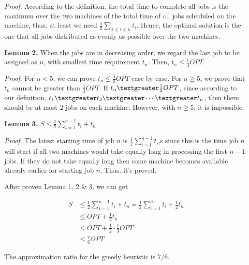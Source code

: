 \textit{Proof.} According to the definition, the total time to complete all jobs is the maximum over the two machines of the total time of all jobs scheduled on the machine, thus, at least we need $ \frac{1}{2} \sum_{1 \le i \le n} t_i$. Hence, the optimal solution is the one that all jobs distributed as evenly as possible over the two machines.

\textbf{Lemma 2.} When the jobs are in decreasing order, we regard the last job to be assigned as $n$, with smallest time requirement $t_n$. Then, $t_n \le \frac{1}{3} OPT$.

\textit{Proof.} For $n<5$, we can prove $t_n \le \frac{1}{3} OPT$ case by case. For $n\ge5$, we prove that $t_n$ cannot be greater than $\frac{1}{3} OPT$. If $t_n \textgreater \frac{1}{3} OPT$, since according to our definition, $t_1  \textgreater t_2 \textgreater \cdots \textgreater t_n$, then there should be at most $2$ jobs on each machine. However, with $n\ge5$, it is impossible. 

\textbf{Lemma 3.} $S \le \frac{1}{2} \sum_{i=1}^{n-1} t_i + t_n$

\textit{Proof.} The latest starting time of job $n$ is $\frac{1}{2} \sum_{i=1}^{n-1} t_i$,s since this is the time job $n$ will start if all two machines would take equally long in processing the first $n-1$ jobs. If they do not take equally long then some machine becomes available already earlier for starting job $n$. Thus, it's proved.

After proven Lemma 1, 2 \& 3, we can get

$$
\begin{aligned}
S &\le \frac{1}{2} \sum_{i=1}^{n-1} t_i + t_n = \frac{1}{2} \sum_{i=1}^{n} t_i + \frac{1}{2}  t_n \\
&\le OPT + \frac{1}{2}  t_n \\
&\le OPT + \frac{1}{2} \cdot \frac{1}{3} OPT \\
&\le \frac{7}{6} OPT
\end{aligned}
$$

The approximation ratio for the greedy heuristic is $7/6$.



